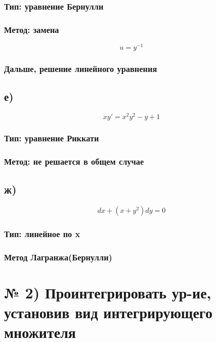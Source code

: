 \documentclass[a4paper]{article}
\begin{document}
\subsubsection*{Тип: уравнение Бернулли}

\subsubsection*{Метод: замена}
\begin{equation*}
u=y^{-1}
\end{equation*}
\subsubsection*{Дальше, решение линейного уравнения}

\subsection*{е)}
\begin{equation*}
x y' = x^2 y^2 - y + 1
\end{equation*}
\subsubsection*{Тип: уравнение Риккати}
\subsubsection*{Метод: не решается в общем случае}

\subsection*{ж)}
\begin{equation*}
dx + (x + y^2)dy = 0
\end{equation*}
\subsubsection*{Тип: линейное по x}

\subsubsection*{Метод Лагранжа(Бернулли)}

\section*{№ 2) Проинтегрировать ур-ие, установив вид интегрирующего множителя}
\end{document}
